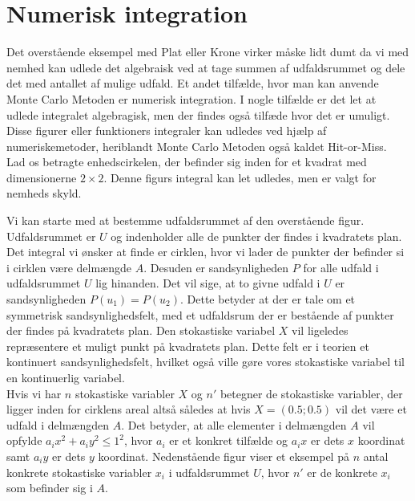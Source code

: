 \documentclass[../../SRP.tex]{subfiles}
\begin{document}
\section{Numerisk integration}

Det overstående eksempel med Plat eller Krone virker måske lidt dumt da vi med nemhed kan udlede det algebraisk ved at tage summen af udfaldsrummet og dele det med antallet af mulige udfald. Et andet tilfælde, hvor man kan anvende Monte Carlo Metoden er numerisk integration. I nogle tilfælde er det let at udlede integralet algebragisk, men der findes også tilfæde hvor det er umuligt. Disse figurer eller funktioners integraler kan udledes ved hjælp af numeriskemetoder, heriblandt Monte Carlo Metoden også kaldet Hit-or-Miss. \cite{SBM} \\

Lad os betragte enhedscirkelen, der befinder sig inden for et kvadrat med dimensionerne $2\times 2$. Denne figurs integral kan let udledes, men er valgt for nemheds skyld.\\



\begin{center}
\end{center}

Vi kan starte med at bestemme udfaldsrummet af den overstående figur. Udfaldsrummet er $U$ og indenholder alle de punkter der findes i kvadratets plan. Det integral vi ønsker at finde er cirklen, hvor vi lader de punkter der befinder si i cirklen være delmængde $A$. Desuden er sandsynligheden $P$ for alle udfald i udfaldsrummet $U$ lig hinanden. Det vil sige, at to givne udfald i $U$ er sandsynligheden $P(u_1) = P(u_2)$. Dette betyder at der er tale om et symmetrisk sandsynlighedsfelt, med et udfaldsrum der er bestående af punkter der findes på kvadratets plan. Den stokastiske variabel $X$ vil ligeledes repræsentere et muligt punkt på kvadratets plan. Dette felt er i teorien et kontinuert sandsynlighedsfelt, hvilket også ville gøre vores stokastiske variabel til en kontinuerlig variabel. \\ 
Hvis vi har $n$ stokastiske variabler $X$ og $n'$ betegner de stokastiske variabler, der ligger inden for cirklens areal altså således at hvis $X = (0.5;0.5)$ vil det være et udfald i delmængden $A$. Det betyder, at alle elementer i delmængden $A$ vil opfylde $a_ix^2+a_iy^2 \leq 1^2$, hvor $a_i$ er et konkret tilfælde og $a_ix$ er dets $x$ koordinat samt $a_iy$ er dets $y$ koordinat. Nedenstående figur viser et eksempel på $n$ antal konkrete stokastiske variabler $x_i$ i udfaldsrummet $U$, hvor $n'$ er de konkrete $x_i$ som befinder sig i $A$.
\end{document}
